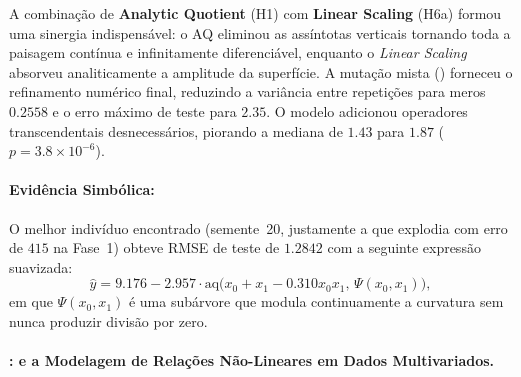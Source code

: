 A combinação de \textbf{Analytic Quotient} (H1) com \textbf{Linear Scaling}
(H6a) formou uma sinergia indispensável: o AQ eliminou as assíntotas
verticais tornando toda a paisagem contínua e infinitamente diferenciável,
enquanto o \emph{Linear Scaling} absorveu analiticamente a amplitude da
superfície. A mutação mista () forneceu o refinamento numérico
final, reduzindo a variância entre repetições para meros $0.2558$ e o erro
máximo de teste para $2.35$. O modelo  adicionou operadores
transcendentais desnecessários, piorando a mediana de $1.43$ para $1.87$
($p = 3.8\times10^{-6}$).

\paragraph{Evidência Simbólica:}
O melhor indivíduo encontrado (semente~20, justamente a que explodia com erro
de $415$ na Fase~1) obteve RMSE de teste de $\mathbf{1.2842}$ com a seguinte
expressão suavizada:
\begin{equation}
  \hat{y} = 9.176 - 2.957 \cdot \mathrm{aq}\Big(x_0 + x_1 - 0.310 x_0 x_1, \, \Psi(x_0, x_1)\Big),
\end{equation}
em que $\Psi(x_0,x_1)$ é uma subárvore que modula continuamente a curvatura
sem nunca produzir divisão por zero.

\paragraph{:  e a Modelagem de Relações Não-Lineares em Dados Multivariados.}
\label{sec:melhor_concrete}

